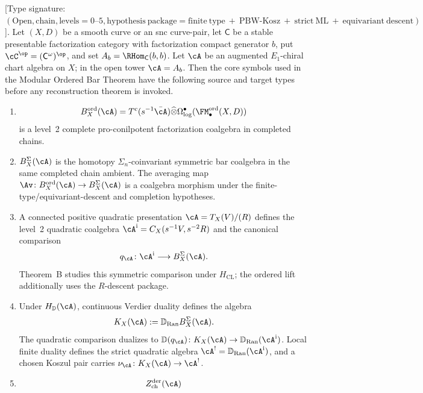 \begin{lemma}
\label{lem:intro-core-ordered-bar-type-correct}
\textup{[}Type signature:
$(\mathrm{Open},\mathrm{chain},
\mathrm{levels}=0\text{--}5,
\mathrm{hypothesis\ package}=\mathrm{finite\ type}
\ +\ \mathrm{PBW\text{-}Kosz}
\ +\ \mathrm{strict\ ML}
\ +\ \mathrm{equivariant\ descent})$\textup{].}
Let \((X,D)\) be a smooth curve or an snc curve-pair, let
\(\mathsf C\) be a stable presentable factorization category with
factorization compact generator \(b\), put
\(\cC^\op=(\mathsf C^\omega)^\op\), and set
\(A_b=\RHom_{\mathsf C}(b,b)\).  Let \(\cA\) be an augmented
\(E_1\)-chiral chart algebra on \(X\); in the open tower
\(\cA=A_b\).  Then the core symbols used in the Modular Ordered Bar
Theorem have the following source and target types before any
reconstruction theorem is invoked.
\begin{enumerate}[label=\textup{(\roman*)}]
\item
\[
B_X^{\mathrm{ord}}(\cA)
 =
T^c(s^{-1}\bar\cA)\widehat\otimes
\Omega^\bullet_{\log}(\FM^{\mathrm{ord}}_\bullet(X,D))
\]
is a level~2 complete pro-conilpotent factorization coalgebra in completed
chains.
\item \(B_X^\Sigma(\cA)\) is the homotopy
\(\Sigma_n\)-coinvariant symmetric bar coalgebra in the same completed
chain ambient.  The averaging map
\(\Av\colon B_X^{\mathrm{ord}}(\cA)\to B_X^\Sigma(\cA)\) is a
coalgebra morphism under the finite-type/equivariant-descent and
completion hypotheses.
\item A connected positive quadratic presentation
\(\cA=T_X(V)/(R)\) defines the level~2 quadratic coalgebra
\(\cA^{\mathrm i}=C_X(s^{-1}V,s^{-2}R)\) and the canonical comparison
\[
q_\cA\colon\cA^{\mathrm i}\longrightarrow B_X^\Sigma(\cA).
\]
Theorem~B studies this symmetric comparison under
\(H_{\mathrm{CL}}\); the ordered lift additionally uses the
\(R\)-descent package.
\item Under \(H_{\mathbb D}(\cA)\), continuous Verdier duality defines
the algebra
\[
K_X(\cA):=\mathbb D_{\operatorname{Ran}}B_X^\Sigma(\cA).
\]
The quadratic comparison dualizes to
\(\mathbb D(q_\cA)\colon K_X(\cA)\to
\mathbb D_{\operatorname{Ran}}(\cA^{\mathrm i})\).
Local finite duality defines the strict quadratic algebra
\(\cA^!=\mathbb D_{\operatorname{Ran}}(\cA^{\mathrm i})\), and a
chosen Koszul pair carries
\(\nu_\cA\colon K_X(\cA)\to\cA^!\).
\item
\[
Z^{\mathrm{der}}_{\mathrm{ch}}(\cA)
\]
\end{enumerate}
\end{lemma}
